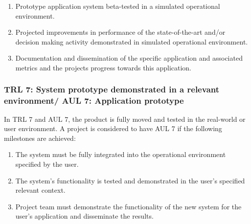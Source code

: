 \documentclass[referee,a4paper,12pt,traditabstract]{swsc}
\begin{document}
\begin{linenumbers}
\begin{enumerate}
\item Prototype application system beta-tested in a simulated operational environment.
\item Projected improvements in performance of the state-of-the-art and/or decision making activity demonstrated in simulated operational environment.  
\item Documentation and dissemination of the specific application and associated metrics and the projects progress towards this application.
\end{enumerate}


\subsubsection{TRL 7: System prototype demonstrated in a relevant environment/ AUL 7: Application prototype}
In TRL 7 and AUL 7, the product is fully moved and tested in the real-world or user environment.  A project is considered to have AUL 7 if the following milestones are achieved: \\

\begin{enumerate}
\item The system must be fully integrated into the operational environment specified by the user. 
\item The system's functionality is tested and demonstrated in the user's specified relevant context. 
\item Project team must demonstrate the functionality of the new system for the user's application and disseminate the results.
\end{enumerate}


\end{linenumbers}
\end{document}
